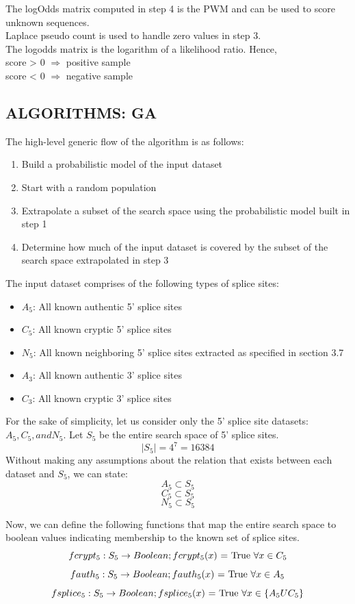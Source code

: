\documentclass[12pt,a4paper]{article}
\begin{document}
	The logOdds matrix computed in step 4 is the PWM and can be used to score unknown sequences.\\
	Laplace pseudo count is used to handle zero values in step 3. \\
	The logodds matrix is the logarithm of a likelihood ratio. Hence, \\
	score > 0 $\Rightarrow$ positive sample \\
    score < 0 $\Rightarrow$ negative sample

	\subsection{ALGORITHMS: GA} \label{sec:algoGA}
	
	The high-level generic flow of the algorithm is as follows:
	\begin{enumerate}
		\item Build a probabilistic model of the input dataset
		\item Start with a random population
		\item Extrapolate a subset of the search space using the probabilistic model built in step 1
		\item Determine how much of the input dataset is covered by the subset of the search space extrapolated in step 3
	\end{enumerate}

	The input dataset comprises of the following types of splice sites:
	\begin{itemize}
		\item $A_5$: All known authentic 5’ splice sites
		\item $C_5$: All known cryptic 5’ splice sites
		\item $N_5$: All known neighboring 5' splice sites extracted as specified in section 3.7
		\item $A_3$: All known authentic 3’ splice sites
		\item $C_3$: All known cryptic 3’ splice sites		
	\end{itemize}
			
	For the sake of simplicity, let us consider only the 5' splice site datasets: $A_5, C_5, and N_5$.
	Let $S_5$ be the entire search space of 5' splice sites.
	$$|S_5| = 4^7 = 16384$$
	Without making any assumptions about the relation that exists between each dataset and $S_5$, we can state: 
	$$ A_5 \subset S_5 $$ 
	$$ C_5 \subset S_5 $$
	$$ N_5 \subset S_5 $$

	Now, we can define the following functions that map the entire search space to boolean values indicating membership to the known set of splice sites.
	$$ fcrypt_5:  S_5 \rightarrow Boolean; fcrypt_5(x)\textnormal{ = True  }\forall x \in C_5 $$
	$$ fauth_5: S_5 \rightarrow Boolean; fauth_5(x)\textnormal{ = True  }\forall x \in A_5 $$
	$$ fsplice_5: S_5 \rightarrow Boolean; fsplice_5(x)\textnormal{ = True  }\forall x \in \{A_5 U C_5\} $$
	
\end{document}
